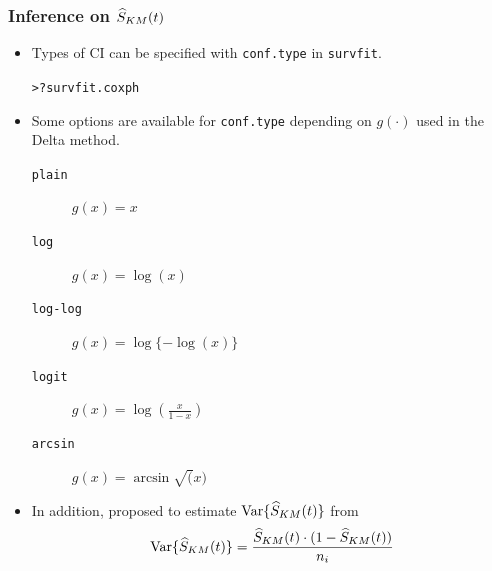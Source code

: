 \documentclass[10pt]{beamer}\usepackage[]{graphicx}\usepackage[]{color}
\makeatletter
\newcommand{\hlopt}[1]{\textcolor[rgb]{0,0,0}{#1}}%
\newcommand{\hlstd}[1]{\textcolor[rgb]{0.345,0.345,0.345}{#1}}%
\newenvironment{kframe}{%
 \def\at@end@of@kframe{}%
 \ifinner\ifhmode%
  \def\at@end@of@kframe{\end{minipage}}%
  \begin{minipage}{\columnwidth}%
 \fi\fi%
 \def\FrameCommand##1{\hskip\@totalleftmargin \hskip-\fboxsep
 \colorbox{shadecolor}{##1}\hskip-\fboxsep
     \hskip-\linewidth \hskip-\@totalleftmargin \hskip\columnwidth}%
 \MakeFramed {\advance\hsize-\width
   \@totalleftmargin\z@ \linewidth\hsize
   \@setminipage}}%
 {\par\unskip\endMakeFramed%
 \at@end@of@kframe}
\newenvironment{knitrout}{}{} %
\renewenvironment{knitrout}{\setlength{\topsep}{-.2mm}}{}
\newcommand{\code}[1]{{\texttt{#1}}}
\newcommand{\Var}{\mathrm{Var}}
\newcommand{\Skm}{\widehat{S}_{\scriptsize{KM}}}
\makeatother
\begin{document}
\begin{frame}[fragile]
  \frametitle{Inference on $\Skm(t)$}
  \begin{itemize}
  \item Types of CI can be specified with \code{conf.type} in \code{survfit}.
\begin{knitrout}\scriptsize
{}\color{fgcolor}\begin{kframe}
\begin{alltt}
\hlstd{> }\hlopt{?}\hlstd{survfit.coxph}
\end{alltt}
\end{kframe}
\end{knitrout}
  \item Some options are available for \code{conf.type} depending on $g(\cdot)$ used in the Delta method.
    \begin{description}
    \item[\code{plain}] $g(x) = x$
      \item[\code{log}] $g(x) = \log(x)$
      \item[\code{log-log}] $g(x) = \log\{-\log(x)\}$
      \item[\code{logit}] $g(x) = \log\left(\frac{x}{1 - x}\right)$
      \item[\code{arcsin}] $g(x) = \arcsin\sqrt(x)$
      \end{description}
  \item In addition, \citet{peto1977design} proposed to estimate $\Var\{\Skm(t)\}$ from
    \begin{equation*}
      \Var\{\Skm(t)\} = \frac{\Skm(t) \cdot (1 - \Skm(t))}{n_i}
    \end{equation*}
  \end{itemize}
\end{frame}
\end{document}
